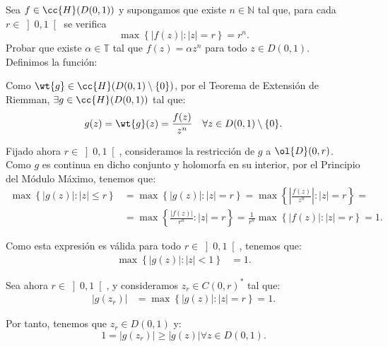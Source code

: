 \documentclass[12pt]{article}
\begin{document}
    \begin{ejercicio}[2.5 puntos]
        Sea $f \in \cc{H}(D(0, 1))$ y supongamos que existe $n \in \mathbb{N}$ tal que, para cada $r \in \left]0,1\right[$ se verifica
        \[
            \max\left\{ |f(z)| : |z| = r \right\} = r^n.
        \]
        Probar que existe $\alpha \in \mathbb{T}$ tal que $f(z) = \alpha z^n$ para todo $z \in D(0, 1)$.\\

        Definimos la función:

        Como $\wt{g}\in \cc{H}(D(0, 1)\setminus \{0\})$, por el Teorema de Extensión de Riemman, $\exists g\in \cc{H}(D(0, 1))$ tal que:
        \begin{equation*}
            g(z) = \wt{g}(z) = \frac{f(z)}{z^n} \quad \forall z\in D(0, 1)\setminus \{0\}.
        \end{equation*}

        Fijado ahora $r\in \left]0, 1\right[$, consideramos la restricción de $g$ a $\ol{D}(0, r)$. Como $g$ es continua en dicho conjunto y holomorfa en su interior, por el Principio del Módulo Máximo, tenemos que:
        \begin{align*}
            \max\left\{ |g(z)| : |z| \leq r \right\} &= \max\left\{ |g(z)| : |z| = r \right\}
            = \max\left\{ \left|\frac{f(z)}{z^n}\right| : |z| = r \right\} 
            =\\&= \max\left\{ \frac{|f(z)|}{r^n} : |z| = r \right\}
            = \frac{1}{r^n}\max\left\{ |f(z)| : |z| = r \right\} = 1.
        \end{align*}

        Como esta expresión es válida para todo $r\in \left]0, 1\right[$, tenemos que:
        \begin{align*}
            \max\left\{ |g(z)| : |z| < 1 \right\} &= 1.
        \end{align*}



        Sea ahora $r\in \left]0, 1\right[$, y consideramos $z_r\in C(0,r)^*$ tal que:
        \begin{align*}
            |g(z_r)| &= \max\left\{ |g(z)| : |z| = r \right\} = 1.
        \end{align*}

        Por tanto, tenemos que $z_r\in D(0, 1)$ y:
        \begin{equation*}
            1 = |g(z_r)| \geq \left|g(z)\right|\forall z\in D(0, 1).
        \end{equation*}


\end{ejercicio}
\end{document}
